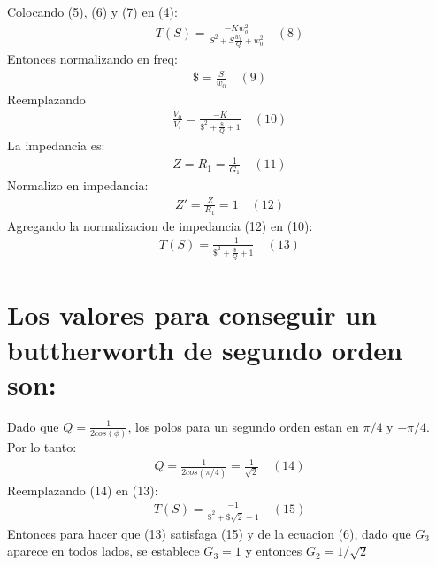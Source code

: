 \documentclass[letterpaper,10pt,english]{sphinxmanual}
\begin{document}
\sphinxAtStartPar
Colocando (5), (6) y (7) en (4):
\begin{equation*}
\begin{split}T(S) = \frac{-Kw_o^2}{S^2+S\frac{w_0}{Q}+w_0^2}\quad(8)\end{split}
\end{equation*}
\sphinxAtStartPar
Entonces normalizando en freq:
\begin{equation*}
\begin{split}\$=\frac{S}{w_0}\quad(9)\end{split}
\end{equation*}
\sphinxAtStartPar
Reemplazando
\begin{equation*}
\begin{split}\frac{V_0}{V_i}=\frac{-K}{\$^2+\frac{\$}{Q}+1}\quad(10)\end{split}
\end{equation*}
\sphinxAtStartPar
La impedancia es:
\begin{equation*}
\begin{split}Z=R_1=\frac{1}{G_1}\quad(11)\end{split}
\end{equation*}
\sphinxAtStartPar
Normalizo en impedancia:
\begin{equation*}
\begin{split}Z'=\frac{Z}{R_1}=1\quad(12)\end{split}
\end{equation*}
\sphinxAtStartPar
Agregando la normalizacion de impedancia (12) en (10):
\begin{equation*}
\begin{split}T(S)=\frac{-1}{\$^2+\frac{\$}{Q}+1}\quad(13)\end{split}
\end{equation*}

\section{Los valores para conseguir un buttherworth de segundo orden son:}
\label{\detokenize{tp-semanal-2:Los-valores-para-conseguir-un-buttherworth-de-segundo-orden-son:}}
\sphinxAtStartPar
Dado que \(Q=\frac{1}{2cos(\phi)}\), los polos para un segundo orden estan en \(\pi/4\) y \(-\pi/4\). Por lo tanto:
\begin{equation*}
\begin{split}Q=\frac{1}{2cos(\pi/4)}=\frac{1}{\sqrt{2}}\quad(14)\end{split}
\end{equation*}
\sphinxAtStartPar
Reemplazando (14) en (13):
\begin{equation*}
\begin{split}T(S)=\frac{-1}{\$^2+\$\sqrt{2}+1}\quad(15)\end{split}
\end{equation*}
\sphinxAtStartPar
Entonces para hacer que (13) satisfaga (15) y de la ecuacion (6), dado que \(G_3\) aparece en todos lados, se establece \(G_3=1\) y entonces \(G_2=1/\sqrt{2}\)
\end{document}
